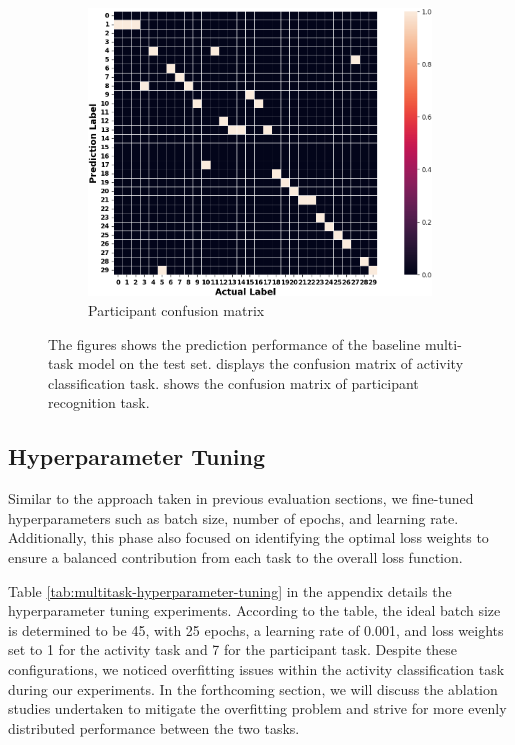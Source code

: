 \documentclass{l4proj}
\begin{document}
\begin{figure}[h]
\begin{subfigure}{0.45\textwidth}
        \includegraphics[width=\textwidth]{images/multitask-participant-initial-test-confusion-matrix.png}
        \caption{Participant confusion matrix}
        \label{fig:multitask-participant-initial-test-confusion-matrix}
    \end{subfigure}
  \caption{The figures shows the prediction performance of the baseline multi-task model on the test set.  displays the confusion matrix of activity classification task.  shows the confusion matrix of participant recognition task.}
  \label{fig:multitask-initial-confusion-matrices}
\end{figure}

\subsection{Hyperparameter Tuning}
Similar to the approach taken in previous evaluation sections, we fine-tuned hyperparameters such as batch size, number of epochs, and learning rate. Additionally, this phase also focused on identifying the optimal loss weights to ensure a balanced contribution from each task to the overall loss function.

Table \ref{tab:multitask-hyperparameter-tuning} in the appendix details the hyperparameter tuning experiments. According to the table, the ideal batch size is determined to be 45, with 25 epochs, a learning rate of 0.001, and loss weights set to 1 for the activity task and 7 for the participant task. Despite these configurations, we noticed overfitting issues within the activity classification task during our experiments. In the forthcoming section, we will discuss the ablation studies undertaken to mitigate the overfitting problem and strive for more evenly distributed performance between the two tasks.
\end{document}

